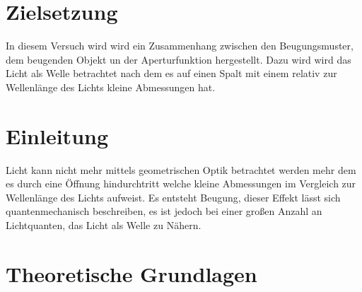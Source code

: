 \section{Zielsetzung}

    \noindent In diesem Versuch wird wird ein Zusammenhang zwischen den Beugungsmuster, dem beugenden Objekt un der Aperturfunktion hergestellt.
    Dazu wird wird das Licht als Welle betrachtet nach dem es auf einen Spalt mit einem relativ zur Wellenlänge des Lichts kleine Abmessungen hat.

\section{Einleitung}

    \noindent Licht kann nicht mehr mittels geometrischen Optik betrachtet werden mehr dem es durch eine Öffnung hindurchtritt welche kleine 
    Abmessungen im Vergleich zur Wellenlänge des Lichts aufweist. Es entsteht Beugung, dieser Effekt lässt sich quantenmechanisch beschreiben, 
    es ist jedoch bei einer großen Anzahl an Lichtquanten, das Licht als Welle zu Nähern. 

\section{Theoretische Grundlagen}

    

